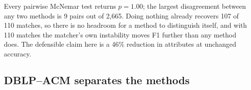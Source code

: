 \documentclass[11pt]{article}
\begin{document}
Every pairwise McNemar test returns $p = 1.00$; the largest disagreement between any two
methods is 9 pairs out of 2{,}665. Doing nothing already recovers 107 of 110 matches, so
there is no headroom for a method to distinguish itself, and with 110 matches the matcher's
own instability moves F1 further than any method does. The defensible claim here is a 46\%
reduction in attributes at unchanged accuracy.

\subsection{DBLP--ACM separates the methods}
\label{sec:dblp}

\begin{table}[h]
\centering
{}
\caption{DBLP--ACM, 2{,}224 ground-truth matches. Every row is a single matcher draw
recorded 12--19 August; see the correction in Section~\ref{sec:correction}, which repeats
the first and fourth rows and finds these levels no longer reproduce.}
\end{table}
\end{document}
